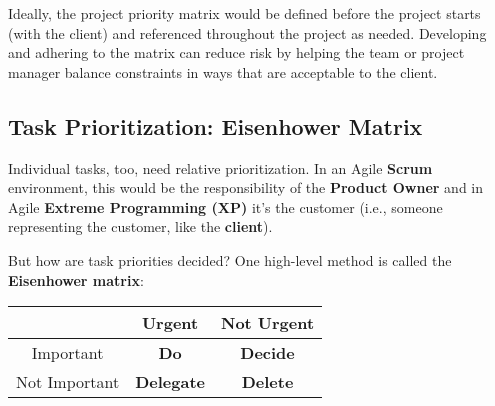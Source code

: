 Ideally, the project priority matrix would be defined before the project starts (with the client) and referenced throughout the project as needed. Developing and adhering to the matrix can reduce risk by helping the team or project manager balance constraints in ways that are acceptable to the client.

\marginpar{\eisenhowerMatrixDef\margindivider}\marginpar{\extremeProgrammingDef\margindivider}\marginpar{\scrumDef}\subsection{Task Prioritization: Eisenhower Matrix}

Individual tasks, too, need relative prioritization. In an Agile \textbf{Scrum} environment, this would be the responsibility of the \textbf{Product Owner} and in Agile \textbf{Extreme Programming (XP)} it's the customer (i.e., someone representing the customer, like the \textbf{client}). 

But how are task priorities decided? One high-level method is called the \textbf{Eisenhower matrix}:

\begin{center}
\begin{tabular}{c|c|c}
    & Urgent & Not Urgent \\
    \hline
    Important & \textbf{Do} & \textbf{Decide} \\
    \hline
    Not Important & \textbf{Delegate} & \textbf{Delete}
\end{tabular}
\end{center}

